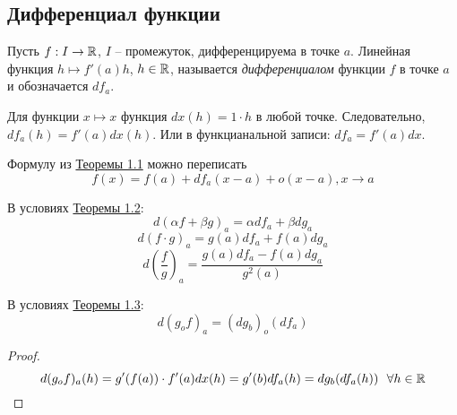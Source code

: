 \subsection{Дифференциал функции}

\begin{definition}
    Пусть $f: I \to \mathbb{R}$, $I$ -- промежуток, дифференцируема в точке $a$. Линейная функция $h \mapsto f'(a)h$, $h \in \mathbb{R}$, называется \textit{дифференциалом} функции $f$ в точке $a$ и обозначается $df_{a}$.
\end{definition}

Для функции $x \mapsto x$ функция $dx(h) = 1\cdot h$ в любой точке. Следовательно, $df_{a}(h) = f'(a)dx(h)$. Или в функцианальной записи: $df_{a}=f'(a)dx$.

\begin{note}
    Формулу из \hyperlink{th1}{Теоремы 1.1} можно переписать
    \[f(x) = f(a) + df_{a}(x-a)+o(x-a), x \to a\]
    \begin{center}
    \end{center}
\end{note}

\begin{corollary}
    В условиях \hyperlink{th2}{Теоремы 1.2}:
    \[d(\alpha f + \beta g)_{a} = \alpha d f_{a} + \beta d g_{a}\]
    \[d(f \cdot g)_{a} = g(a)df_{a} + f(a)dg_{a}\]
    \[d(\frac{f}{g})_{a} = \frac{g(a)df_{a}-f(a)dg_{a}}{g^{2}(a)}\]
\end{corollary}

\begin{corollary}
    В условиях \hyperlink{th3}{Теоремы 1.3}:
    \[d(g_{o}f)_{a} = (dg_{b})_{o}(df_{a})\]
\end{corollary}

\begin{proof}
    \[d(g_{o}f)_{a}(h) = g'(f(a))\cdot f'(a)dx(h)=g'(b)df_{a}(h) = dg_{b}(df_{a}(h)) \ \ \forall h \in \mathbb{R}\]
\end{proof}

